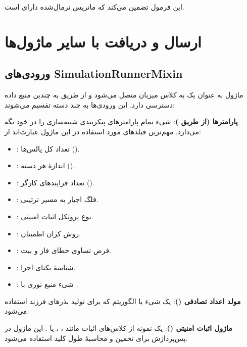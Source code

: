 \noindent این فرمول تضمین می‌کند که ماتریس نرمال‌شده دارای  است.

\section{ارسال و دریافت با سایر ماژول‌ها}

\subsection{ورودی‌های SimulationRunnerMixin}

ماژول  به عنوان یک  به کلاس میزبان متصل می‌شود و از طریق  به چندین منبع داده دسترسی دارد. این ورودی‌ها به چند دسته تقسیم می‌شوند:

\textbf{پارامترها (از طریق )}: شیء  تمام پارامترهای پیکربندی شبیه‌سازی را در خود نگه می‌دارد. مهم‌ترین فیلدهای مورد استفاده در این ماژول عبارت‌اند از:

\begin{itemize}
	\item {}: تعداد کل پالس‌ها ().
	\item {}: اندازۀ هر دسته ().
	\item {}: تعداد فرایندهای کارگر ().
	\item {}: فلگ اجبار به مسیر ترتیبی.
	\item {}: نوع پروتکل اثبات امنیتی.
	\item {}: روش کران اطمینان.
	\item {}: فرض تساوی خطای فاز و بیت.
	\item {}: شناسۀ یکتای اجرا.
	\item {}: شیء منبع نوری با .
\end{itemize}

\textbf{مولد اعداد تصادفی ()}: یک شیء  با الگوریتم  که برای تولید بذرهای فرزند استفاده می‌شود.

\textbf{ماژول اثبات امنیتی ()}: یک نمونه از کلاس‌های اثبات مانند ، ،  یا . این ماژول در پس‌پردازش برای تخمین  و محاسبۀ طول کلید استفاده می‌شود.

